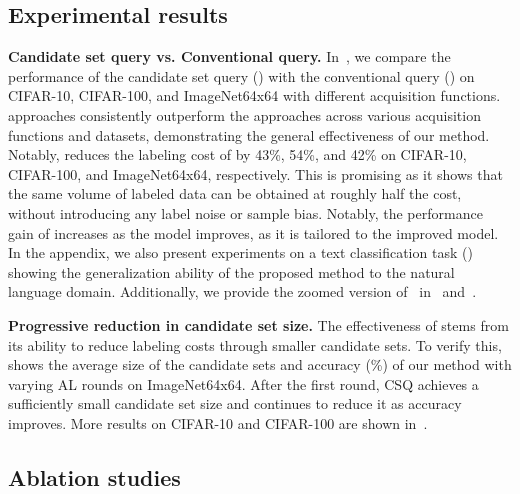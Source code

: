 \subsection{Experimental results}
\noindent\textbf{Candidate set query vs. Conventional query.}
In~, we compare the performance of the candidate set query () with the conventional query () on CIFAR-10, CIFAR-100, and ImageNet64x64 with different acquisition functions.
 approaches consistently outperform the  approaches across various acquisition functions and datasets, demonstrating the general effectiveness of our method.
Notably,  reduces the labeling cost of  by 43\%, 54\%, and 42\% on CIFAR-10, CIFAR-100, and ImageNet64x64, respectively.
This is promising as it shows that the same volume of labeled data can be obtained at roughly half the cost, without introducing any label noise or sample bias.
Notably, the performance gain of  increases as the model improves, as it is tailored to the improved model.
In the appendix, we also present experiments on a text classification task () showing the generalization ability of the proposed method to the natural language domain.
Additionally, we provide the zoomed version of~ in~ and~.

{\noindent\textbf{Progressive reduction in candidate set size.}
The effectiveness of  stems from its ability to reduce labeling costs through smaller candidate sets.
To verify this,  shows the average size of the candidate sets and accuracy (\%) of our method with varying AL rounds on ImageNet64x64.
After the first round, CSQ achieves a sufficiently small candidate set size and continues to reduce it as accuracy improves.
More results on CIFAR-10 and CIFAR-100 are shown in~.}



\subsection{Ablation studies}


